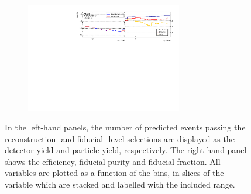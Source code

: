 \begin{figure}[htb]
\begin{subfigure}{.99\textwidth}
    \end{subfigure}
    \begin{subfigure}{.99\textwidth}\centering
        \includegraphics[width = 0.75\textwidth]{Figures/m4l/UnfoldingStudies/v014_inputs/m34_m4loffshellinputs.pdf}
    \end{subfigure}
    \caption{In the left-hand panels, the number of predicted events passing the reconstruction- and fiducial- level selections are displayed as the detector yield and particle yield, respectively. The right-hand panel shows the efficiency, fiducial purity and fiducial fraction. All variables are plotted as a function of the \mZTwo bins, in slices of the \mFourL variable which are stacked and labelled with the included \mFourL range.
    \label{fig:mZ2unf}}
\end{figure}  

\FloatBarrier
\clearpage


